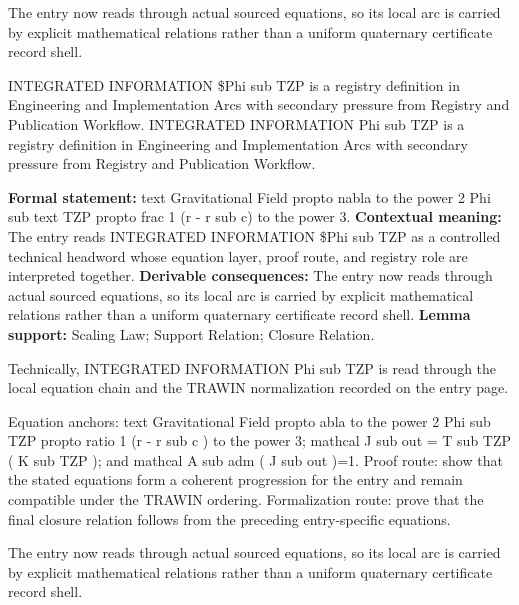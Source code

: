 The entry now reads through actual sourced equations, so its local arc is carried by explicit mathematical relations rather than a uniform quaternary certificate record shell.
\clearpage


\begingroup\small
{}
INTEGRATED INFORMATION \$Phi sub TZP is a registry definition in Engineering and Implementation Arcs with secondary pressure from Registry and Publication Workflow. INTEGRATED INFORMATION Phi sub TZP is a registry definition in Engineering and Implementation Arcs with secondary pressure from Registry and Publication Workflow.

\begingroup\footnotesize\setlength{\emergencystretch}{3em}\sloppy
\textbf{Formal statement:} text Gravitational Field propto nabla to the power 2 Phi sub text TZP propto frac 1 (r - r sub c) to the power 3. \textbf{Contextual meaning:} The entry reads INTEGRATED INFORMATION \$Phi sub TZP as a controlled technical headword whose equation layer, proof route, and registry role are interpreted together. \textbf{Derivable consequences:} The entry now reads through actual sourced equations, so its local arc is carried by explicit mathematical relations rather than a uniform quaternary certificate record shell. \textbf{Lemma support:} Scaling Law; Support Relation; Closure Relation.\par
\endgroup

Technically, INTEGRATED INFORMATION Phi sub TZP is read through the local equation chain and the TRAWIN normalization recorded on the entry page.

Equation anchors: text Gravitational Field propto abla to the power 2 Phi sub TZP propto ratio 1 (r - r sub c ) to the power 3; mathcal J sub out = T sub TZP ( K sub TZP ); and mathcal A sub adm ( J sub out )=1. Proof route: show that the stated equations form a coherent progression for the entry and remain compatible under the TRAWIN ordering. Formalization route: prove that the final closure relation follows from the preceding entry-specific equations.

The entry now reads through actual sourced equations, so its local arc is carried by explicit mathematical relations rather than a uniform quaternary certificate record shell.
\endgroup

